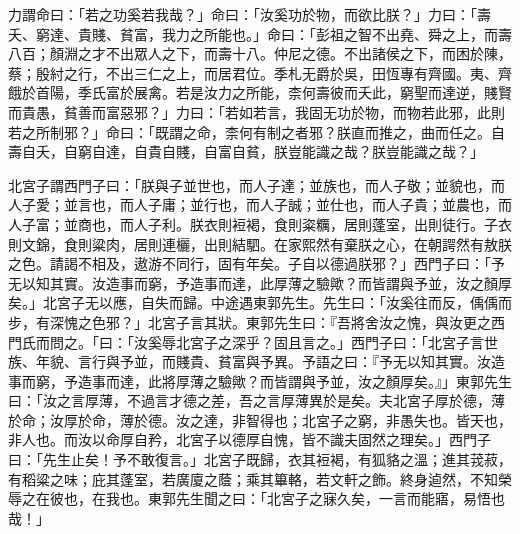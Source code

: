 
\begin{pinyinscope}
力謂命曰：「若之功奚若我哉？」命曰：「汝奚功於物，而欲比朕？」力曰：「壽夭、窮達、貴賤、貧富，我力之所能也。」命曰：「彭祖之智不出堯、舜之上，而壽八百；顏淵之才不出眾人之下，而壽十八。仲尼之德。不出諸侯之下，而困於陳，蔡；殷紂之行，不出三仁之上，而居君位。季札无爵於吳，田恆專有齊國。夷、齊餓於首陽，季氏富於展禽。若是汝力之所能，柰何壽彼而夭此，窮聖而達逆，賤賢而貴愚，貧善而富惡邪？」力曰：「若如若言，我固无功於物，而物若此邪，此則若之所制邪？」命曰：「既謂之命，柰何有制之者邪？朕直而推之，曲而任之。自壽自夭，自窮自達，自貴自賤，自富自貧，朕豈能識之哉？朕豈能識之哉？」

北宮子謂西門子曰：「朕與子並世也，而人子達；並族也，而人子敬；並貌也，而人子愛；並言也，而人子庸；並行也，而人子誠；並仕也，而人子貴；並農也，而人子富；並商也，而人子利。朕衣則裋褐，食則粢糲，居則蓬室，出則徒行。子衣則文錦，食則粱肉，居則連欐，出則結駟。在家熙然有棄朕之心，在朝諤然有敖朕之色。請謁不相及，遨游不同行，固有年矣。子自以德過朕邪？」西門子曰：「予无以知其實。汝造事而窮，予造事而達，此厚薄之驗歟？而皆謂與予並，汝之顏厚矣。」北宮子无以應，自失而歸。中途遇東郭先生。先生曰：「汝奚往而反，偊偊而步，有深愧之色邪？」北宮子言其狀。東郭先生曰：『吾將舍汝之愧，與汝更之西門氏而問之。「曰：「汝奚辱北宮子之深乎？固且言之。」西門子曰：「北宮子言世族、年貌、言行與予並，而賤貴、貧富與予異。予語之曰：『予无以知其實。汝造事而窮，予造事而達，此將厚薄之驗歟？而皆謂與予並，汝之顏厚矣。』」東郭先生曰：「汝之言厚薄，不過言才德之差，吾之言厚薄異於是矣。夫北宮子厚於德，薄於命；汝厚於命，薄於德。汝之達，非智得也；北宮子之窮，非愚失也。皆天也，非人也。而汝以命厚自矜，北宮子以德厚自愧，皆不識夫固然之理矣。」西門子曰：「先生止矣！予不敢復言。」北宮子既歸，衣其裋褐，有狐貉之溫；進其茙菽，有稻粱之味；庇其蓬室，若廣廈之蔭；乘其篳輅，若文軒之飾。終身逌然，不知榮辱之在彼也，在我也。東郭先生聞之曰：「北宮子之寐久矣，一言而能寤，易悟也哉！」


\end{pinyinscope}
